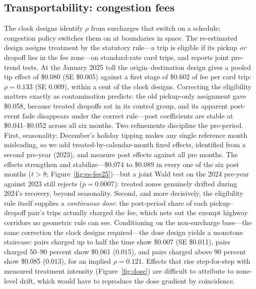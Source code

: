 \subsection{Transportability: congestion fees}
\label{sec:results-fee}
The clock designs identify $\rho$ from surcharges that switch on a
schedule; congestion policy switches them on at boundaries in space.
The re-estimated design assigns treatment by the statutory rule---a trip
is eligible if its pickup \emph{or} dropoff lies in the fee zone---on
standard-rate card trips, and reports joint pre-trend tests. At the
January 2025 toll the origin--destination design gives a pooled tip
effect of \$0.080 (SE \$0.005) against a first stage of \$0.602 of
fee per card trip: $\rho = 0.133$ (SE $0.009$), within a cent of the
clock designs. Correcting the eligibility matters exactly as
contamination predicts: the old pickup-only assignment gave \$0.058,
because treated dropoffs sat in its control group, and its apparent
post-event fade disappears under the correct rule---post coefficients
are stable at \$0.041--\$0.052 across all six months. Two refinements
discipline the pre-period. First, seasonality: December's holiday
tipping makes any single reference month misleading, so we add
treated-by-calendar-month fixed effects, identified from a second
pre-year (2023), and measure post effects against all pre months. The
effects strengthen and stabilize---\$0.074 to \$0.089 in every one of
the six post months ($t > 8$; Figure~\ref{fig:es-fee25})---but a joint
Wald test on the 2024 pre-year against 2023 still rejects
($p = 0.0007$): treated zones genuinely drifted during 2024's recovery,
beyond seasonality. Second,
and more decisively, the eligibility rule itself supplies a
\emph{continuous dose}: the post-period share of each pickup--dropoff
pair's trips actually charged the fee, which nets out the exempt
highway corridors no geometric rule can see. Conditioning on the
non-surcharge base---the same correction the clock designs
required---the dose design yields a monotone staircase: pairs charged
up to half the time show \$0.007 (SE \$0.011), pairs charged 50--90
percent show \$0.061 ($0.015$), and pairs charged above 90 percent
show \$0.085 ($0.013$), for an implied $\rho = 0.121$. Effects that
rise step-for-step with measured treatment intensity
(Figure~\ref{fig:dose}) are difficult to attribute to zone-level
drift, which would have to reproduce the dose gradient by coincidence.

